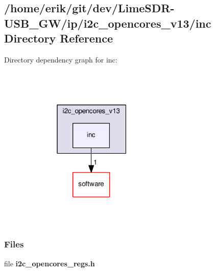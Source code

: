 \subsection{/home/erik/git/dev/\+Lime\+S\+D\+R-\/\+U\+S\+B\+\_\+\+G\+W/ip/i2c\+\_\+opencores\+\_\+v13/inc Directory Reference}
\label{dir_526e2447ee203f62a21729351dcd47fb}
Directory dependency graph for inc\+:
\nopagebreak
\begin{figure}[H]
\begin{center}
\leavevmode
\includegraphics[width=197pt]{dir_526e2447ee203f62a21729351dcd47fb_dep}
\end{center}
\end{figure}
\subsubsection*{Files}
\begin{DoxyCompactItemize}
\item 
file {\bf i2c\+\_\+opencores\+\_\+regs.\+h}
\end{DoxyCompactItemize}
